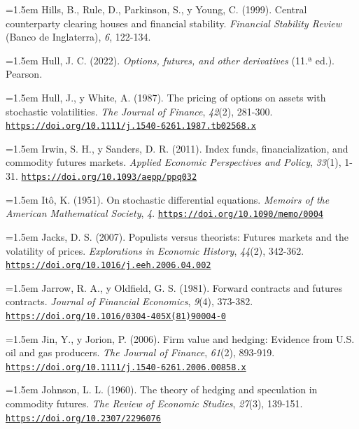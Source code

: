 \documentclass[10pt,a4paper]{article}
\begin{document}
\noindent\hangindent=1.5em Hills, B., Rule, D., Parkinson, S., y Young, C. (1999). Central counterparty clearing houses and financial stability. \textit{Financial Stability Review} (Banco de Inglaterra), \textit{6}, 122-134.

\noindent\hangindent=1.5em Hull, J. C. (2022). \textit{Options, futures, and other derivatives} (11.ª ed.). Pearson.

\noindent\hangindent=1.5em Hull, J., y White, A. (1987). The pricing of options on assets with stochastic volatilities. \textit{The Journal of Finance}, \textit{42}(2), 281-300. \href{https://doi.org/10.1111/j.1540-6261.1987.tb02568.x}{\nolinkurl{https://doi.org/10.1111/j.1540-6261.1987.tb02568.x}}

\noindent\hangindent=1.5em Irwin, S. H., y Sanders, D. R. (2011). Index funds, financialization, and commodity futures markets. \textit{Applied Economic Perspectives and Policy}, \textit{33}(1), 1-31. \href{https://doi.org/10.1093/aepp/ppq032}{\nolinkurl{https://doi.org/10.1093/aepp/ppq032}}

\noindent\hangindent=1.5em Itô, K. (1951). On stochastic differential equations. \textit{Memoirs of the American Mathematical Society}, \textit{4}. \href{https://doi.org/10.1090/memo/0004}{\nolinkurl{https://doi.org/10.1090/memo/0004}}

\noindent\hangindent=1.5em Jacks, D. S. (2007). Populists versus theorists: Futures markets and the volatility of prices. \textit{Explorations in Economic History}, \textit{44}(2), 342-362. \href{https://doi.org/10.1016/j.eeh.2006.04.002}{\nolinkurl{https://doi.org/10.1016/j.eeh.2006.04.002}}

\noindent\hangindent=1.5em Jarrow, R. A., y Oldfield, G. S. (1981). Forward contracts and futures contracts. \textit{Journal of Financial Economics}, \textit{9}(4), 373-382. \href{https://doi.org/10.1016/0304-405X(81)90004-0}{\nolinkurl{https://doi.org/10.1016/0304-405X(81)90004-0}}

\noindent\hangindent=1.5em Jin, Y., y Jorion, P. (2006). Firm value and hedging: Evidence from U.S. oil and gas producers. \textit{The Journal of Finance}, \textit{61}(2), 893-919. \href{https://doi.org/10.1111/j.1540-6261.2006.00858.x}{\nolinkurl{https://doi.org/10.1111/j.1540-6261.2006.00858.x}}

\noindent\hangindent=1.5em Johnson, L. L. (1960). The theory of hedging and speculation in commodity futures. \textit{The Review of Economic Studies}, \textit{27}(3), 139-151. \href{https://doi.org/10.2307/2296076}{\nolinkurl{https://doi.org/10.2307/2296076}}
\end{document}
